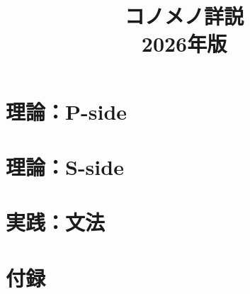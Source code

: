 \documentclass[b5paper, 10pt]{ltjsbook}
\begin{document}
\title{\huge{コノメノ詳説\\ 2026年版}}
\maketitle

\tableofcontents



\part{理論：P-side}




\part{理論：S-side}









\part{実践：文法}







\part{付録}


\nocite{wiki-personal, inquisitive, arai, dolce, bfo, yamato, ryan, kurada1, kurada2, hamano}
\nocite{dowty1979, bach1986, krifka1998, rodrigues-abel2019}


\end{document}
